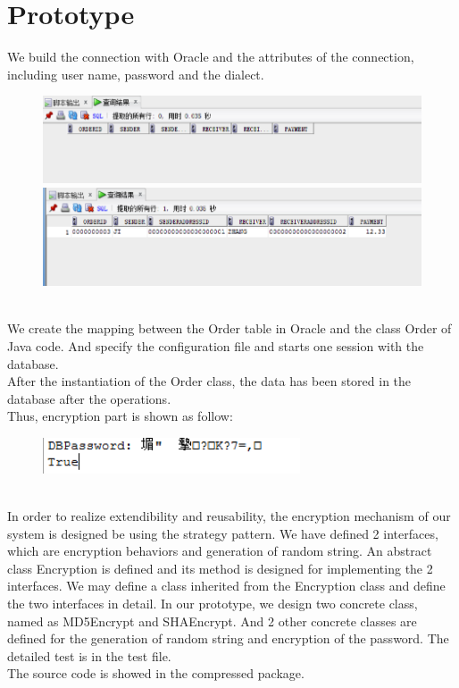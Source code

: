\documentclass[12pt]{scrreprt}
\begin{document}
\chapter{Prototype}
We build the connection with Oracle and the attributes of the connection, including user name, password and the dialect.\\
\begin{figure}[htbp]
	\centering\includegraphics{DocumentRes/database1.png}
	\centering\includegraphics{DocumentRes/database2.png}	
\end{figure}\\
We create the mapping between the Order table in Oracle and the class Order of Java code. And specify the configuration file and starts one session with the database.\\
After the instantiation of the Order class, the data has been stored in the database after the operations.\\
Thus, encryption part is shown as follow:\\
\begin{figure}[htbp]
	\centering\includegraphics[width=3in]{DocumentRes/database3.png}
\end{figure}\\
In order to realize extendibility and reusability, the encryption mechanism of our system is designed be using the strategy pattern. We have defined 2 interfaces, which are encryption behaviors and generation of random string. An abstract class Encryption is defined and its method is designed for implementing the 2 interfaces. We may define a class inherited from the Encryption class and define the two interfaces in detail. In our prototype, we design two concrete class, named as MD5Encrypt and SHAEncrypt. And 2 other concrete classes are defined for the generation of random string and encryption of the password. The detailed test is in the test file.\\
The source code is showed in the compressed package.
\end{document}
